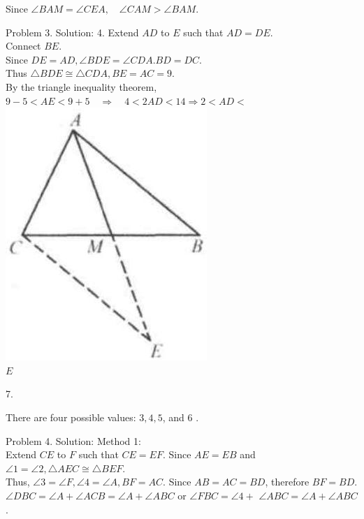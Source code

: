 \documentclass[10pt]{article}
\begin{document}
Since \(\angle B A M=\angle C E A, \quad \angle C A M>\angle B A M\).

Problem 3. Solution: 4.
Extend \(A D\) to \(E\) such that \(A D=D E\).\\
Connect \(B E\).\\
Since \(D E=A D, \angle B D E=\angle C D A . B D=D C\).\\
Thus \(\triangle B D E \cong \triangle C D A, B E=A C=9\).\\
By the triangle inequality theorem,\\
\(9-5<A E<9+5 \quad \Rightarrow \quad 4<2 A D<14 \Rightarrow 2<A D<\)\\
\includegraphics[max width=\textwidth, center]{2025_04_17_97bc1f7e44d93c271a88g-029(1)}\\
\(E\)

7.

There are four possible values: \(3,4,5\), and 6 .


Problem 4. Solution:
Method 1:\\
Extend \(C E\) to \(F\) such that \(C E=E F\). Since \(A E=E B\) and \(\angle 1=\angle 2, \triangle A E C \cong \triangle B E F\).\\
Thus, \(\angle 3=\angle F, \angle 4=\angle A, B F=A C\). Since \(A B=A C=B D\), therefore \(B F=B D\). \(\angle D B C=\angle A+\angle A C B=\angle A+\angle A B C\) or \(\angle F B C=\angle 4+\) \(\angle A B C=\angle A+\angle A B C\).
\end{document}
